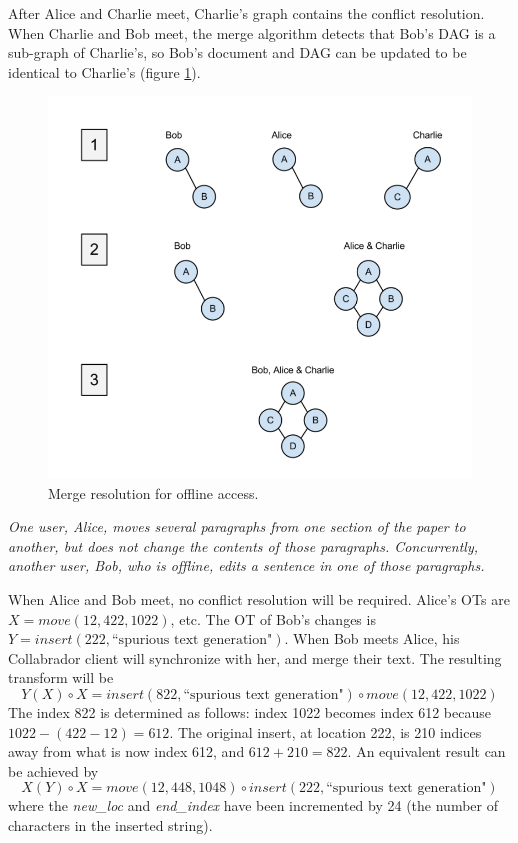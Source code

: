 \documentclass[11pt,titlepage]{article}
\begin{document}
After Alice and Charlie meet, Charlie's graph contains the conflict
resolution.  When Charlie and Bob meet, the merge algorithm detects
that Bob's DAG is a sub-graph of Charlie's, so Bob's document and DAG
can be updated to be identical to Charlie's (figure \ref{fig:image}).

\begin{figure}[h]
  \centering
  \includegraphics[width=5in]{image.png}
  \caption{Merge resolution for offline access.   \label{fig:image}}
\end{figure}

\vspace{5mm}
\noindent
\emph{One user, Alice, moves several paragraphs from one section of
  the paper to another, but does not change the contents of those
  paragraphs. Concurrently, another user, Bob, who is offline, edits a
  sentence in one of those paragraphs.}

\vspace{5mm}

When Alice and Bob meet, no conflict resolution will be
required. Alice's OTs are $X = move(12,422, 1022)$, etc.  The OT of
Bob's changes is $Y = insert(222, \text{``spurious text generation"})$. When Bob
meets Alice, his Collabrador client will synchronize with her, and
merge their text. The resulting transform will be 
\begin{equation*}
Y(X) \circ X = insert(822,
\text{``spurious text generation"}) \circ move(12,422, 1022)
\end{equation*}
The index 822 is determined as follows: index 1022 becomes index 612 because
\(1022-(422-12) = 612.\)  The original insert, at location 222, is 210
indices away from what is now index 612, and \(612+210 = 822.\) An equivalent
result can be achieved by
\begin{equation*}
X(Y) \circ X = move(12,448,1048) \circ insert(222, \text{``spurious text generation"})
\end{equation*}
where the \textit{new\_loc} and \textit{end\_index} have been incremented by 24 (the number of
characters in the inserted string).
\end{document}
